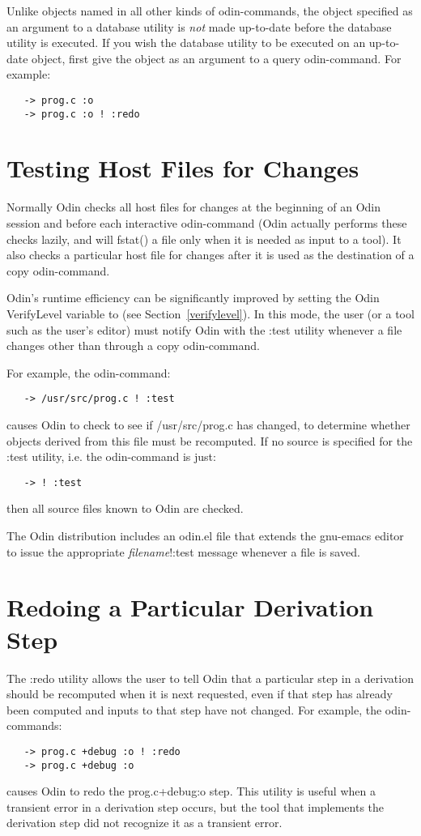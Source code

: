 Unlike objects named in all other kinds of odin-commands,
the object specified as an argument to a database utility
is {\em not} made up-to-date before the database utility is executed.
If you wish the database utility to be executed on an up-to-date object,
first give the object as an argument to a query odin-command.
For example:
\begin{verbatim}
   -> prog.c :o
   -> prog.c :o ! :redo
\end{verbatim}

\section{Testing Host Files for Changes}

Normally Odin checks all host files for changes
at the beginning of an Odin session and before each interactive
odin-command (Odin actually performs these checks lazily,
and will {\ex fstat()} a file only when it is needed
as input to a tool).
It also checks a particular host file for changes after
it is used as the destination of a copy odin-command.

Odin's runtime efficiency can be significantly improved by setting
the Odin {\ex VerifyLevel} variable to {}
(see Section~\ref{verifylevel}).
In this mode, the user (or a tool such as the user's editor)
must notify Odin with the {\ex :test} utility
whenever a file changes other than through a copy odin-command.

For example, the odin-command:
\begin{verbatim}
   -> /usr/src/prog.c ! :test
\end{verbatim}
causes Odin to check to see if {\ex /usr/src/prog.c} has changed,
to determine whether objects derived from this file must be recomputed.
If no source is specified for the {\ex :test} utility,
i.e. the odin-command is just:
\begin{verbatim}
   -> ! :test
\end{verbatim}
then all source files known to Odin are checked.

The Odin distribution includes an {\ex odin.el} file
that extends the gnu-emacs editor to issue the appropriate
{\em filename}{\ex!:test} message whenever a file is saved.

\section{Redoing a Particular Derivation Step}

The {\ex :redo} utility allows the user to tell Odin that
a particular step in a derivation should be recomputed
when it is next requested,
even if that step has already been computed and
inputs to that step have not changed.
For example, the odin-commands:
\begin{verbatim}
   -> prog.c +debug :o ! :redo
   -> prog.c +debug :o
\end{verbatim}
causes Odin to redo the {\ex prog.c+debug:o} step.
This utility is useful when a transient error in a derivation step occurs,
but the tool that implements the derivation step did not recognize it as
a transient error.


